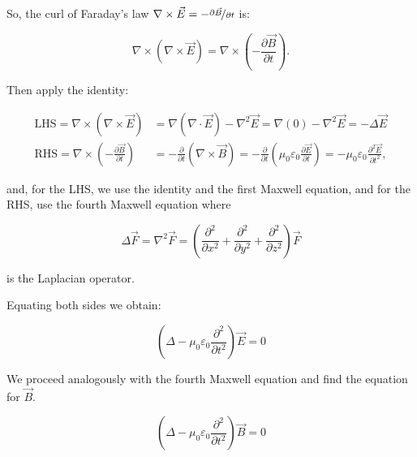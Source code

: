         So, the curl of Faraday's law $\nabla\times\vec{E} = -\nicefrac{\partial\vec{B}}{\partial t}$ is:

        \begin{equation*}
            \nabla\times\left(\nabla\times\vec{E}\right) = \nabla\times\left(- \frac{\partial\vec{B}}{\partial t}\right).
        \end{equation*}

        Then apply the identity:

        \begin{equation*}
            \begin{aligned}
                \mathrm{LHS} = \nabla\times\left(\nabla\times\vec{E}\right)                 &= \nabla\left(\nabla\cdot\vec{E}\right) - \nabla^{2}\vec{E} =  \nabla\left( 0 \right) - \nabla^{2}\vec{E} = - \Delta \vec{E}\\
                \mathrm{RHS} = \nabla\times\left(- \frac{\partial\vec{B}}{\partial t}\right) &= - \frac{\partial}{\partial t}\left(\nabla\times\vec{B}\right) = - \frac{\partial}{\partial t} \left( \mu_{0}\varepsilon_{0}\frac{\partial\vec{E}}{\partial t} \right) = - \mu_{0}\varepsilon_{0}\frac{\partial^{2}\vec{E}}{\partial t^{2}},
            \end{aligned}
        \end{equation*}

        and, for the LHS, we use the identity and the first Maxwell equation, and for the RHS, use the fourth Maxwell equation where

        \begin{equation*}
            \Delta \vec{F} = \nabla^{2} \vec{F} = \left( \frac{\partial^2}{\partial x^2} + \frac{\partial^2}{\partial y^2} + \frac{\partial^2}{\partial z^2} \right) \vec{F}
        \end{equation*}

        is the Laplacian operator.

        Equating both sides we obtain:

        \begin{equation}\label{eq:em-wave}
            \left(\Delta - \mu_{0}\varepsilon_{0}\frac{\partial^{2}}{\partial t^{2}}\right)\vec{E} = 0
        \end{equation}

        We proceed analogously with the fourth Maxwell equation and find the equation for $\vec{B}$.

        \begin{equation*}
            \left(\Delta - \mu_{0}\varepsilon_{0}\frac{\partial^{2}}{\partial t^{2}}\right)\vec{B} = 0
        \end{equation*}

